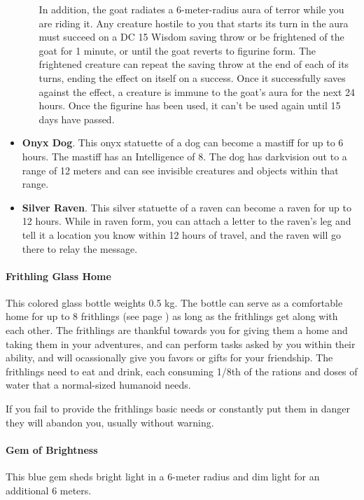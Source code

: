 \begin{itemize}
\begin{itemize}
                In addition, the goat radiates a 6-meter-radius aura of terror while you are riding it.
                Any creature hostile to you that starts its turn in the aura must succeed on a DC 15 Wisdom saving throw or be frightened of the goat for 1 minute, or until the goat reverts to figurine form.
                The frightened creature can repeat the saving throw at the end of each of its turns, ending the effect on itself on a success. Once it successfully saves against the effect, a creature is immune to the goat's aura for the next 24 hours.
                Once the figurine has been used, it can't be used again until 15 days have passed.
            \end{itemize}
            \item \textbf{Onyx Dog}.
            This onyx statuette of a dog can become a mastiff for up to 6 hours.
            The mastiff has an Intelligence of 8.
            The dog has darkvision out to a range of 12 meters and can see invisible creatures and objects within that range.
            \item \textbf{Silver Raven}.
            This silver statuette of a raven can become a raven for up to 12 hours.
            While in raven form, you can attach a letter to the raven's leg and tell it a location you know within 12 hours of travel, and the raven will go there to relay the message.
        \end{itemize}
    \paragraph{Frithling Glass Home} %
        This colored glass bottle weights 0.5 kg.
        The bottle can serve as a comfortable home for up to 8 frithlings (see page \pageref{creature::frithling}) as long as the frithlings get along with each other.
        The frithlings are thankful towards you for giving them a home and taking them in your adventures, and can perform tasks asked by you within their ability, and will ocassionally give you favors or gifts for your friendship.
        The frithlings need to eat and drink, each consuming 1/8th of the rations and doses of water that a normal-sized humanoid needs.

        If you fail to provide the frithlings basic needs or constantly put them in danger they will abandon you, usually without warning.
    \paragraph{Gem of Brightness}
        This blue gem sheds bright light in a 6-meter radius and dim light for an additional 6 meters.
